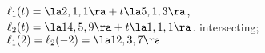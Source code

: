 {$\ell_1(t) = \la 2,1,1\ra + t\la 5,1,3\ra$,\\
$\ell_2(t) = \la 14,5,9\ra + t\la 1,1,1\ra$.
}
{intersecting; $\ell_1(2) = \ell_2(-2) = \la 12,3,7\ra$
}


